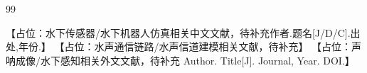 

\cleardoublepage
\sloppy
\begin{thebibliography}{99}
\raggedright
\setlength{\itemsep}{0pt}

 【占位：水下传感器/水下机器人仿真相关中文文献，待补充作者.题名[J/D/C].出处,年份.】
 【占位：水声通信链路/水声信道建模相关文献，待补充】
 【占位：声呐成像/水下感知相关外文文献，待补充 Author. Title[J]. Journal, Year. DOI.】

\end{thebibliography}
